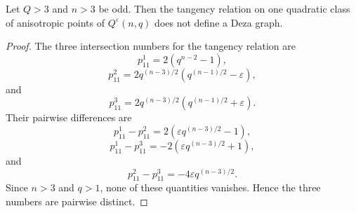 \documentclass[10pt,a4paper]{amsart}
\begin{document}
\begin{prop}
Let $Q>3$ and $n>3$ be odd. Then the tangency relation on one quadratic class of anisotropic points of $Q^\varepsilon(n,q)$ does not define a Deza graph.
\end{prop}

\begin{proof}
The three intersection numbers for the tangency relation are \[
p_{11}^1=2(q^{n-2}-1),
\]
\[
p_{11}^2=
2q^{(n-3)/2}
\left(q^{(n-1)/2}-\varepsilon\right),
\]
and
\[
p_{11}^3=
2q^{(n-3)/2}
\left(q^{(n-1)/2}+\varepsilon\right).
\]
Their pairwise differences are
\[
p_{11}^1-p_{11}^2
=
2\left(\varepsilon q^{(n-3)/2}-1\right),
\]
\[
p_{11}^1-p_{11}^3
=
-2\left(\varepsilon q^{(n-3)/2}+1\right),
\]
and
\[
p_{11}^2-p_{11}^3
=
-4\varepsilon q^{(n-3)/2}.
\]
Since $n>3$ and $q>1$, none of these quantities vanishes. Hence the three numbers are pairwise distinct.
\end{proof}
\end{document}
